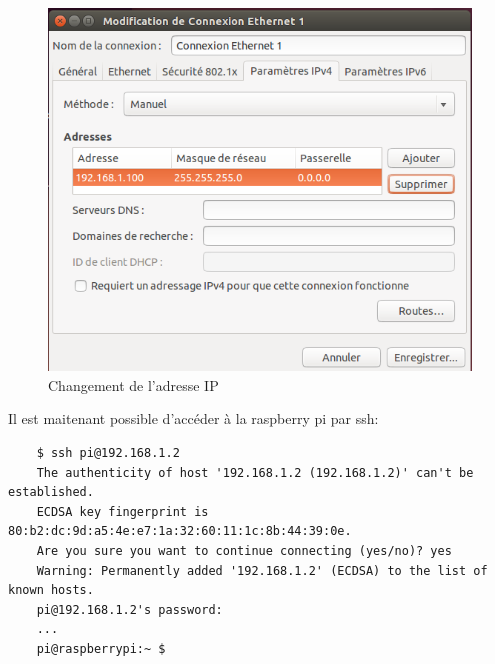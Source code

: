 \begin{figure}[H]
	\begin{center}
		\includegraphics[width=14cm]{img/vmConfig2.png}
		\caption{Changement de l'adresse IP}
		\label{evLinuxConfig2}
	\end{center}
\end{figure}
Il est maitenant possible d'accéder à la raspberry pi par ssh:
\begin{lstlisting}
	$ ssh pi@192.168.1.2
	The authenticity of host '192.168.1.2 (192.168.1.2)' can't be established.
	ECDSA key fingerprint is 80:b2:dc:9d:a5:4e:e7:1a:32:60:11:1c:8b:44:39:0e.
	Are you sure you want to continue connecting (yes/no)? yes
	Warning: Permanently added '192.168.1.2' (ECDSA) to the list of known hosts.
	pi@192.168.1.2's password: 
	...
	pi@raspberrypi:~ $ 
\end{lstlisting}

